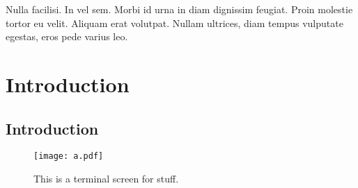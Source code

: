 \graphicspath{{figures/chapter-1/}}


\begin{savequote}[75mm]
Nulla facilisi. In vel sem. Morbi id urna in diam dignissim feugiat. Proin molestie tortor eu velit. Aliquam erat volutpat. Nullam    ultrices, diam tempus vulputate egestas, eros pede varius leo.
\end{savequote}

\chapter{Introduction}
	\label{chapter:introduction}


\section{Introduction}

\lipsum[1-6]\cite{Narten1967}

\begin{figure}[h]
\texttt{[image: a.pdf]}
\caption[This is a short caption]{This is a terminal screen for stuff.\cite{Narten1967}}
\end{figure}


